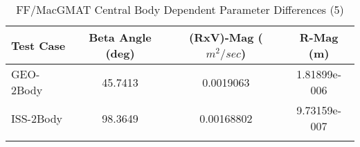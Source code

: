 \begin{table}[htbp!]
\centering
\caption{ FF/MacGMAT Central Body Dependent Parameter Differences (5)}
      \begin{tabular}{lccc}
      \hline\hline
          Test Case & Beta Angle (deg) & (RxV)-Mag ($m^2/sec$) & R-Mag (m) \\
         \hline
         GEO-2Body & 45.7413 & 0.0019063 & 1.81899e-006 \\
         ISS-2Body & 98.3649 & 0.00168802 & 9.73159e-007 \\
      \hline\hline
      \label{Table: FF-MacGMAT CB Parameters Set 5} 
\end{tabular}
\end{table}
